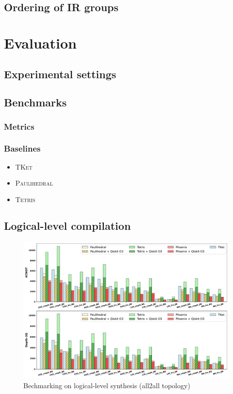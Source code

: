 \documentclass[conference]{IEEEtran}
\newcommand{\tket}{\textsc{TKet}}
\newcommand{\tetris}{\textsc{Tetris}}
\newcommand{\paulihedral}{\textsc{Paulihedral}}
\begin{document}
\subsection{Ordering of IR groups}



\section{Evaluation}


\subsection{Experimental settings}

\subsection{Benchmarks}

\subsubsection{Metrics}

\subsubsection{Baselines}

\begin{itemize}
    \item \tket
    \item \paulihedral
    \item \tetris
\end{itemize}



\subsection{Logical-level compilation}


\begin{figure}[tbp]
    \centering
    \includegraphics[width=\columnwidth]{figures/all2all.pdf}
    \caption{Bechmarking on logical-level synthesis (all2all topology)}
    \label{fig:all2all}
\end{figure}
\end{document}
